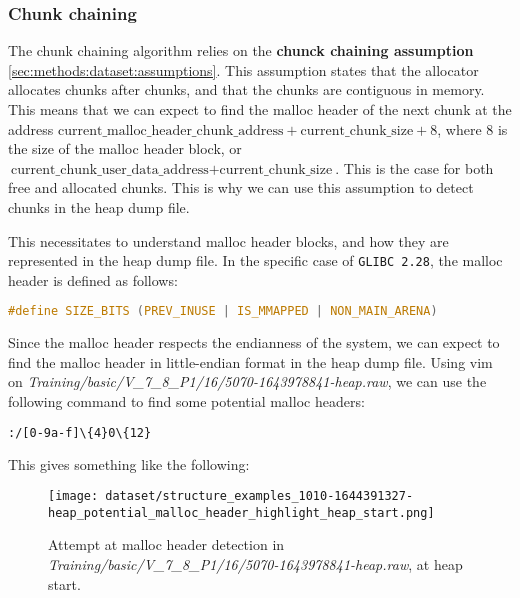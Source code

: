     \subsubsection{Chunk chaining}
    The chunk chaining algorithm relies on the \textbf{chunck chaining assumption} \ref{sec:methods:dataset:assumptions}. This assumption states that the allocator allocates chunks after chunks, and that the chunks are contiguous in memory. This means that we can expect to find the malloc header of the next chunk at the address $ \text{current\_malloc\_header\_chunk\_address} + \text{current\_chunk\_size} + 8 $, where 8 is the size of the malloc header block, or $ \text{current\_chunk\_user\_data\_address} + \text{current\_chunk\_size} $. This is the case for both free and allocated chunks. This is why we can use this assumption to detect chunks in the heap dump file. 
    
    This necessitates to understand malloc header blocks, and how they are represented in the heap dump file. In the specific case of \texttt{GLIBC 2.28}, the malloc header is defined as follows:

    \begin{minipage}{\dimexpr\linewidth-20pt}
        \begin{lstlisting}[language=c, caption={Malloc header definition in \texttt{GLIBC 2.28}}]
            #define SIZE_BITS (PREV_INUSE | IS_MMAPPED | NON_MAIN_ARENA)
        \end{lstlisting}
    \end{minipage}
    
    Since the malloc header respects the endianness of the system, we can expect to find the malloc header in little-endian format in the heap dump file. Using vim on \textit{Training/basic/V\_7\_8\_P1/16/5070-1643978841-heap.raw}, we can use the following command to find some potential malloc headers:

    \begin{lstlisting}[language=bash, caption={Vim command to find potential malloc headers}]
        :/[0-9a-f]\{4}0\{12}
    \end{lstlisting}
    
    This gives something like the following:

    \begin{figure}[H]
        \centering
        \texttt{[image: dataset/structure\_examples\_1010-1644391327-heap\_potential\_malloc\_header\_highlight\_heap\_start.png]}
        \caption{Attempt at malloc header detection in \textit{Training/basic/V\_7\_8\_P1/16/5070-1643978841-heap.raw}, at heap start.}
    \end{figure}

